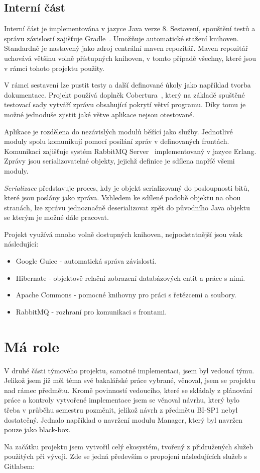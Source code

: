 \documentclass[thesis=B,czech]{FITthesis}[2012/06/26]
\begin{document}
\subsection{Interní část}
Interní část je implementována v jazyce Java verze 8. Sestavení, spouštění testů a správu závislostí zajišťuje Gradle~\cite{gradle}.
Umožňuje automatické stažení knihoven. Standardně je nastavený jako zdroj
centrální maven repozitář.\cite{mavenRepo} Maven repozitář uchovává většinu volně přístupných knihoven, v tomto případě všechny, které jsou v rámci tohoto projektu použity.
\par
V rámci sestavení lze pustit testy a další definované úkoly jako například tvorba dokumentace. Projekt používá
doplněk Cobertura~\cite{cobertura}, který na základě spuštěné testovací sady vytváří zprávu obsahující pokrytí větví programu.
Díky tomu je možné jednoduše zjistit jaké větve aplikace nejsou otestované.
\par
Aplikace je rozdělena do nezávislých modulů běžící jako služby. Jednotlivé moduly spolu komunikují
pomocí posílání zpráv v definovaných frontách. Komunikaci zajišťuje systém RabbitMQ Server~\cite{rabbitMQ} implementovaný v jazyce Erlang. Zprávy jsou serializovatelné objekty, jejichž definice je sdílena napříč všemi moduly.
\par
\textit{Serializace} představuje proces, kdy je objekt serializovaný do posloupnosti bitů, které jsou poslány jako zpráva. 
Vzhledem ke sdílené podobě objektu na obou stranách, lze zprávu jednoznačně deserializovat zpět do původního Java objektu se kterým
je možné dále pracovat.\cite{serialization}
\par
Projekt využívá mnoho volně dostupných knihoven, nejpodstatnější jsou však následující:
\begin{itemize}
\item Google Guice - automatická správa závislostí. \cite{guice}
\item Hibernate - objektově relační zobrazení databázových entit a práce s nimi. \cite{hibernate}
\item Apache Commons - pomocné knihovny pro práci s řetězcemi a soubory. \cite{commons}
\item RabbitMQ - rozhraní pro komunikaci s frontami. \cite{rabbitMQ}
\end{itemize}

\section{Má role}
V druhé části týmového projektu, samotné implementaci, jsem byl vedoucí týmu. Jelikož jsem již měl téma své bakalářské práce vybrané, 
věnoval, jsem se projektu nad rámec předmětu. Kromě povinností vedoucího, které se skládaly z plánování práce a kontroly vytvořené implementace
jsem se věnoval návrhu, který bylo třeba v průběhu semestru pozměnit, jelikož návrh z předmětu BI-SP1 nebyl dostatečný. Jednalo například
o navržení modulu Manager, který byl navržen pouze jako black-box.
\par
Na začátku projektu jsem vytvořil celý ekosystém, tvořený z přidružených služeb použitých při vývoji.
Zde se jedná především o propojení následujících služeb s Gitlabem:
\end{document}
